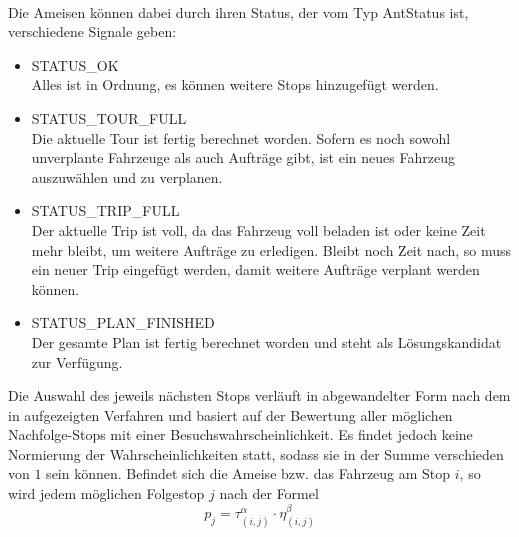 \\
Die Ameisen können dabei durch ihren Status, der vom Typ \textsf{AntStatus} ist, verschiedene Signale geben:
\begin{itemize}
  \item \textsf{STATUS\_OK} \\
    Alles ist in Ordnung, es können weitere Stops hinzugefügt werden.
  \item \textsf{STATUS\_TOUR\_FULL} \\
    Die aktuelle Tour ist fertig berechnet worden. Sofern es noch sowohl unverplante Fahrzeuge als auch Aufträge gibt, ist ein neues Fahrzeug auszuwählen und zu verplanen.
  \item \textsf{STATUS\_TRIP\_FULL} \\
    Der aktuelle Trip ist voll, da das Fahrzeug voll beladen ist oder keine Zeit mehr bleibt, um weitere Aufträge zu erledigen. Bleibt noch Zeit nach, so muss ein neuer Trip eingefügt werden, damit weitere Aufträge verplant werden können.
  \item \textsf{STATUS\_PLAN\_FINISHED} \\
    Der gesamte Plan ist fertig berechnet worden und steht als Lösungskandidat zur Verfügung. \\
\end{itemize}

\noindent
Die Auswahl des jeweils nächsten Stops verläuft in abgewandelter Form nach dem in  aufgezeigten Verfahren und basiert auf der Bewertung aller möglichen Nachfolge-Stops mit einer Besuchswahrscheinlichkeit. Es findet jedoch keine Normierung der Wahrscheinlichkeiten statt, sodass sie in der Summe verschieden von $1$ sein können. Befindet sich die Ameise bzw. das Fahrzeug am Stop $i$, so wird jedem möglichen Folgestop $j$ nach der Formel
\begin{equation}\label{eqn:probability_adapted}
p_j = \tau_{(i,j)}^\alpha \cdot \eta_{(i,j)}^\beta
\end{equation}

